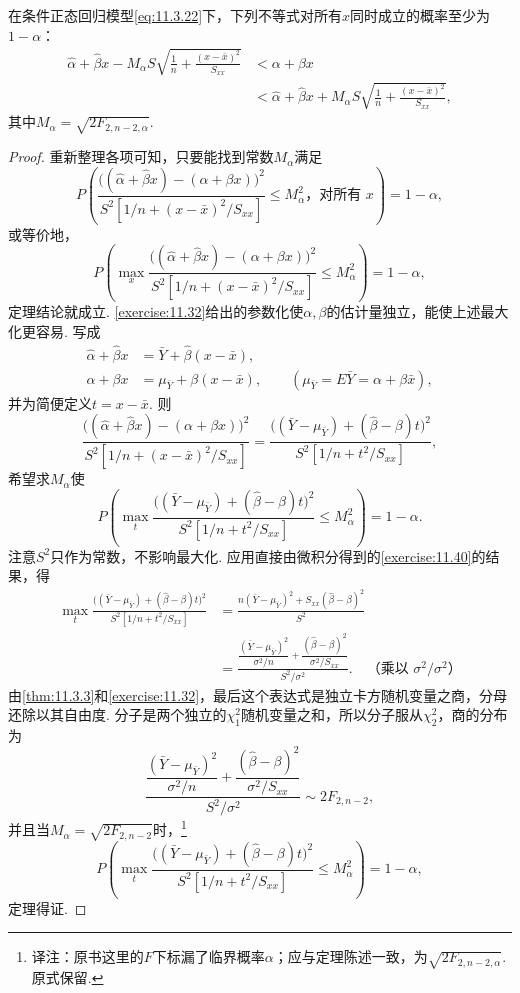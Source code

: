 \begin{theorem}\label{thm:11.3.6}
在条件正态回归模型\eqref{eq:11.3.22}下，下列不等式对所有$x$同时成立的概率至少为$1-\alpha$：
\begin{equation}\label{eq:11.3.43}
\begin{aligned}
\hat\alpha+\hat\beta x-M_\alpha S\sqrt{\frac1n+\frac{(x-\bar x)^2}{S_{xx}}}
&<\alpha+\beta x\\
&<\hat\alpha+\hat\beta x+M_\alpha S\sqrt{\frac1n+\frac{(x-\bar x)^2}{S_{xx}}},
\end{aligned}
\end{equation}
其中$M_\alpha=\sqrt{2F_{2,n-2,\alpha}}$.
\end{theorem}
\begin{proof}
重新整理各项可知，只要能找到常数$M_\alpha$满足
$$P\left(\frac{\bigl((\hat\alpha+\hat\beta x)-(\alpha+\beta x)\bigr)^2}
{S^2[1/n+(x-\bar x)^2/S_{xx}]}\le M_\alpha^2\text{，对所有 }x\right)=1-\alpha,$$
或等价地，
$$P\left(\max_x\frac{\bigl((\hat\alpha+\hat\beta x)-(\alpha+\beta x)\bigr)^2}
{S^2[1/n+(x-\bar x)^2/S_{xx}]}\le M_\alpha^2\right)=1-\alpha,$$
定理结论就成立. \autoref{exercise:11.32}给出的参数化使$\alpha,\beta$的估计量独立，能使上述最大化更容易. 写成
\begin{align*}
\hat\alpha+\hat\beta x&=\bar Y+\hat\beta(x-\bar x),\\
\alpha+\beta x&=\mu_{\bar Y}+\beta(x-\bar x),
\qquad(\mu_{\bar Y}=E\bar Y=\alpha+\beta\bar x),
\end{align*}
并为简便定义$t=x-\bar x$. 则
$$\frac{\bigl((\hat\alpha+\hat\beta x)-(\alpha+\beta x)\bigr)^2}{S^2[1/n+(x-\bar x)^2/S_{xx}]}
=\frac{\bigl((\bar Y-\mu_{\bar Y})+(\hat\beta-\beta)t\bigr)^2}{S^2[1/n+t^2/S_{xx}]},$$
希望求$M_\alpha$使
$$P\left(\max_t\frac{\bigl((\bar Y-\mu_{\bar Y})+(\hat\beta-\beta)t\bigr)^2}{S^2[1/n+t^2/S_{xx}]}\le M_\alpha^2\right)=1-\alpha.$$
注意$S^2$只作为常数，不影响最大化. 应用直接由微积分得到的\autoref{exercise:11.40}的结果，得
\begin{equation}\label{eq:11.3.44}
\begin{aligned}
\max_t\frac{\bigl((\bar Y-\mu_{\bar Y})+(\hat\beta-\beta)t\bigr)^2}{S^2[1/n+t^2/S_{xx}]}
&=\frac{n(\bar Y-\mu_{\bar Y})^2+S_{xx}(\hat\beta-\beta)^2}{S^2}\\
&=\frac{\dfrac{(\bar Y-\mu_{\bar Y})^2}{\sigma^2/n}+\dfrac{(\hat\beta-\beta)^2}{\sigma^2/S_{xx}}}{S^2/\sigma^2}.
\quad\text{（乘以 }\sigma^2/\sigma^2\text{）}
\end{aligned}
\end{equation}
由\autoref{thm:11.3.3}和\autoref{exercise:11.32}，最后这个表达式是独立卡方随机变量之商，分母还除以其自由度. 分子是两个独立的$\chi^2_1$随机变量之和，所以分子服从$\chi^2_2$，商的分布为
$$\frac{\dfrac{(\bar Y-\mu_{\bar Y})^2}{\sigma^2/n}+\dfrac{(\hat\beta-\beta)^2}{\sigma^2/S_{xx}}}{S^2/\sigma^2}\sim2F_{2,n-2},$$
并且当$M_\alpha=\sqrt{2F_{2,n-2}}$时，\footnote{译注：原书这里的$F$下标漏了临界概率$\alpha$；应与定理陈述一致，为$\sqrt{2F_{2,n-2,\alpha}}$. 原式保留.}
$$P\left(\max_t\frac{\bigl((\bar Y-\mu_{\bar Y})+(\hat\beta-\beta)t\bigr)^2}{S^2[1/n+t^2/S_{xx}]}\le M_\alpha^2\right)=1-\alpha,$$
定理得证.
\end{proof}

